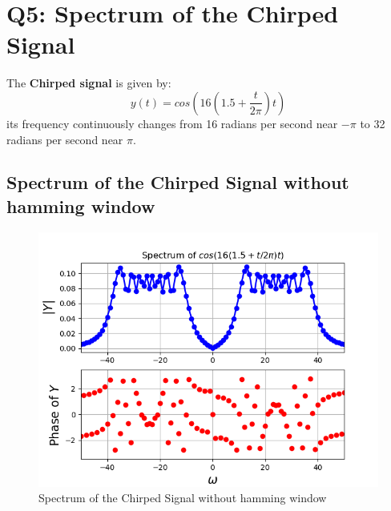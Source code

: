 \documentclass[11pt]{article}
\begin{document}
\section{Q5: Spectrum of the Chirped Signal}
The \textbf{Chirped signal} is given by:
\begin{equation}
    y(t)=cos(16(1.5+\frac{t}{2\pi})t)
\end{equation}
its frequency continuously changes from 16 radians per second near $-\pi$ to 32 radians per second near $\pi$.

\subsection{Spectrum of the Chirped Signal without hamming window}
\begin{figure}[H]
    \centering
    \includegraphics[scale = 0.75]{Figure_10.png}
    \caption{Spectrum of the Chirped Signal without hamming window}
\end{figure}
\end{document}
